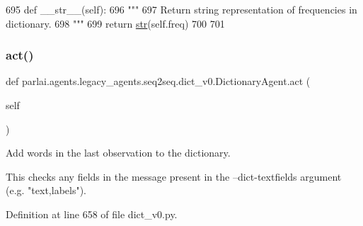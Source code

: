 \begin{DoxyCode}
695     \textcolor{keyword}{def }\_\_str\_\_(self):
696         \textcolor{stringliteral}{"""}
697 \textcolor{stringliteral}{        Return string representation of frequencies in dictionary.}
698 \textcolor{stringliteral}{        """}
699         \textcolor{keywordflow}{return} \hyperlink{namespacegenerate__task__READMEs_a5b88452ffb87b78c8c85ececebafc09f}{str}(self.freq)
700 
701 
\end{DoxyCode}
\mbox{\label{classparlai_1_1agents_1_1legacy__agents_1_1seq2seq_1_1dict__v0_1_1DictionaryAgent_ab0369e37e5da8b1d44a95c4765701cdc}} 
\subsubsection{\texorpdfstring{act()}{act()}}
{\footnotesize\ttfamily def parlai.\+agents.\+legacy\+\_\+agents.\+seq2seq.\+dict\+\_\+v0.\+Dictionary\+Agent.\+act (\begin{DoxyParamCaption}\item[{}]{self }\end{DoxyParamCaption})}

\begin{DoxyVerb}Add words in the last observation to the dictionary.

This checks any fields in the message present in the --dict-textfields argument
(e.g. "text,labels").
\end{DoxyVerb}
 

Definition at line 658 of file dict\+\_\+v0.\+py.


